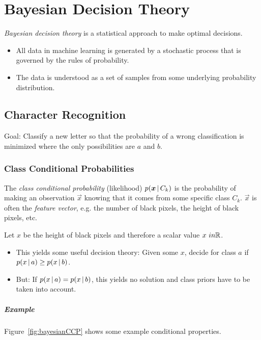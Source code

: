 \chapter{Bayesian Decision Theory}
	\label{c:bayesianDecisionTheory}

	\emph{Bayesian decision theory} is a statistical approach to make optimal decisions.

	\begin{itemize}
		\item All data in machine learning is generated by a stochastic process that is governed by the rules of probability.
		\item The data is understood as a set of samples from some underlying probability distribution.
	\end{itemize}

	\section{Character Recognition}
		Goal: Classify a new letter so that the probability of a wrong classification is minimized where the only possibilities are \(a\) and \(b\).

		\subsection{Class Conditional Probabilities}
			The \emph{class conditional probability} (likelihood) \( p(\bm{x} \,\vert\, C_k) \) is the probability of making an observation \(\vec{x}\) knowing that it comes from some specific class \(C_k\). \(\vec{x}\) is often the \emph{feature vector}, e.g. the number of black pixels, the height of black pixels, etc.

			Let \(x\) be the height of black pixels and therefore a scalar value \(x\ in \mathbb{R}\).

			\begin{itemize}
				\item This yields some useful decision theory: Given some \(x\), decide for class \(a\) if \( p(x \,\vert\, a) \geq p(x \,\vert\, b) \).
				\item But: If \( p(x \,\vert\, a) = p(x \,\vert\, b) \), this yields no solution and class priors have to be taken into account.
			\end{itemize}

			\paragraph{Example}
				Figure~\ref{fig:bayesianCCP} shows some example conditional properties.

